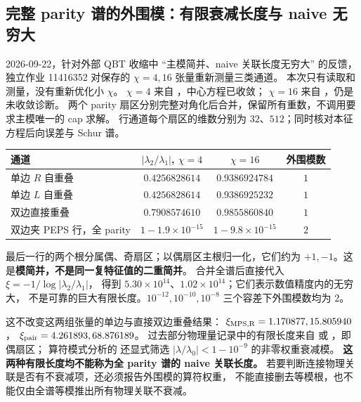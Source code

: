 \documentclass[11pt]{article}
\begin{document}
\subsection{完整 parity 谱的外围模：有限衰减长度与 naive 无穷大}
2026-09-22，针对外部 QBT 收缩中 ``主模简并、naive 关联长度无穷大''
的反馈，独立作业 11416352 对保存的 $\chi=4,16$ 张量重新测量三类通道。
本次只有读取和测量，没有重新优化小 $\chi$。
$\chi=4$ 来自 ，中心方程已收敛；
$\chi=16$ 来自 ，仍是未收敛诊断。
两个 parity 扇区分别完整对角化后合并，保留所有重数，不调用要求主模唯一的 cap 求解。
行通道每个扇区的维数分别为 $32$、$512$；同时核对本征方程后向误差与 Schur 谱。
\begin{center}\small
\begin{tabular}{lccc}
\hline
通道 & $|\lambda_2/\lambda_1|$, $\chi=4$ & $\chi=16$ & 外围模数\\
\hline
单边 $R$ 自重叠 & $0.4256828614$ & $0.9386924784$ & $1$\\
单边 $L$ 自重叠 & $0.4256828614$ & $0.9386925232$ & $1$\\
双边直接重叠 & $0.7908574610$ & $0.9855860840$ & $1$\\
双边夹 PEPS 行，全 parity & $1-1.9\times10^{-15}$ & $1-9.8\times10^{-15}$ & $2$\\
\hline
\end{tabular}
\end{center}
最后一行的两个根分属偶、奇扇区；以偶扇区主根归一化，它们约为
$+1,-1$。这是\textbf{模简并，不是同一复特征值的二重简并}。
合并全谱后直接代入 $\xi=-1/\log|\lambda_2/\lambda_1|$，
得到 $5.30\times10^{14}$、$1.02\times10^{14}$；它们表示数值精度内的无穷大，
不是可靠的巨大有限长度。$10^{-12},10^{-10},10^{-8}$ 三个容差下外围模数均为 $2$。

这不改变这两组张量的单边与直接双边重叠结果：
$\xi_{\rm MPS,R}=1.170877,15.805940$，
$\xi_{\rm pair}=4.261893,68.876189$。
过去部分物理量记录中的有限长度来自
 或 ，即偶扇区；
算符模式分析的  还显式筛选
$|\lambda/\lambda_0|<1-10^{-9}$ 的非零权重衰减模。
\textbf{这两种有限长度均不能称为全 parity 谱的 naive 关联长度。}
若要判断连接物理关联是否有不衰减项，还必须报告外围模的算符权重，
不能直接删去等模根，也不能仅由全谱等模推出所有物理关联不衰减。
\end{document}
